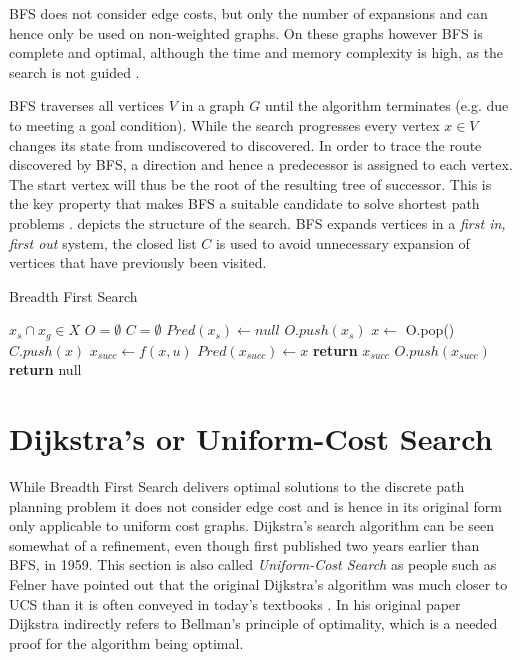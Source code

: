 BFS does not consider edge costs, but only the number of expansions and can hence only be used on non-weighted graphs. On these graphs however BFS is complete and optimal, although the time and memory complexity is high, as the search is not guided \cite{Lee.1961,LaValle.2006} .

BFS traverses all vertices $V$ in a graph $G$ until the algorithm terminates (e.g. due to meeting a goal condition). While the search progresses every vertex $x \in V$ changes its state from undiscovered to discovered. In order to trace the route discovered by BFS, a direction and hence a predecessor is assigned to each vertex. The start vertex will thus be the root of the resulting tree of successor. This is the key property that makes BFS a suitable candidate to solve shortest path problems \cite{Skiena.2008}.  depicts the structure of the search. BFS expands vertices in a \textit{first in, first out} system, the closed list $C$ is used to avoid unnecessary expansion of vertices that have previously been visited.

\begin{algorithm}
    \caption{Breadth First Search}\label{alg:BFS}
    \begin{algorithmic}[1]
        \Require $x_s \cap x_g \in X$
        \State $O = \emptyset$
        \State $C = \emptyset$
        \State $Pred(x_s) \gets null$
        \State $O.push(x_s)$
            \State $x \gets$ O.pop()
            \State $C.push(x)$
                    \State $x_{succ} \gets f(x,u)$
                            \State $Pred(x_{succ}) \gets x$
                                \State \textbf{return} $x_{succ}$
                            \EndIf
                            \State $O.push(x_{succ})$
                        \EndIf
                    \EndIf
                \EndFor
        \EndWhile
        \State \textbf{return} null
    \end{algorithmic}
\end{algorithm}

\section{Dijkstra's or Uniform-Cost Search}
While Breadth First Search delivers optimal solutions to the discrete path planning problem it does not consider edge cost and is hence in its original form only applicable to uniform cost graphs. Dijkstra's search algorithm can be seen somewhat of a refinement, even though first published two years earlier than BFS, in 1959. This section is also called \emph{Uniform-Cost Search} as people such as Felner have pointed out that the original Dijkstra's algorithm was much closer to UCS than it is often conveyed in today's textbooks \cite{Felner.2011}. In his original paper Dijkstra indirectly refers to Bellman's principle of optimality, which is a needed proof for the algorithm being optimal.

